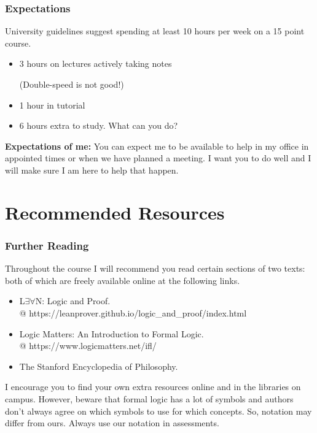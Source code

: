 \documentclass{beamer}
\theoremstyle{indentDefn} \newtheorem{defn}[]{Definition}
\begin{document}
\begin{frame}
	\frametitle{Expectations}
	
	University guidelines suggest spending at least 10 hours per week on a 15 point course. 
	
	\begin{itemize}
		\item 3 hours on lectures actively taking notes 
		
		(Double-speed is not good!)
		\item 1 hour in tutorial
		\item 6 hours extra to study. What can you do? 
	\end{itemize}
	\vspace{3cm}
	
	{\bf Expectations of me:} You can expect me to be available to help in my office in appointed times or when we have planned a meeting. I want you to do well and I will make sure I am here to help that happen. 
	
\end{frame}

\section{Recommended Resources}
\begin{frame}
  \frametitle{Further Reading}

  Throughout the course I will recommend you read certain sections of two texts: both of which are freely available online at the following links. 
  
  \vspace{0.5cm}
  
  \begin{itemize}
  	\item L$\exists \forall$N: Logic and Proof. \\ 
  			@ https://leanprover.github.io/logic\_and\_proof/index.html
  	\item Logic Matters: An Introduction to Formal Logic. \\ 
  			@ https://www.logicmatters.net/ifl/  	
   	\item The Stanford Encyclopedia of Philosophy.
  \end{itemize}

	\vspace{0.5cm}

	I encourage you to find your own extra resources online and in the libraries on campus. However, beware that formal logic has a lot of symbols and authors don't always agree on which symbols to use for which concepts. So, notation may differ from ours. Always use our notation in assessments. 

\end{frame}
\end{document}
